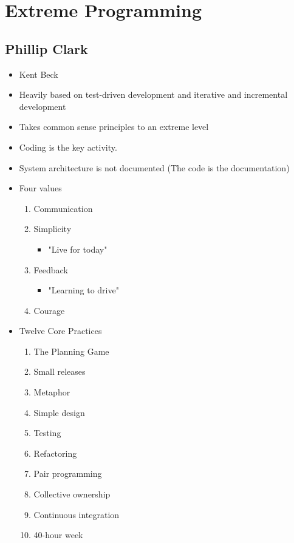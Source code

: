 \documentclass{report}
\begin{document}
		\section{Extreme Programming}
			\subsection{Phillip Clark}
				\begin{itemize}
					\item Kent Beck
					\item Heavily based on test-driven development and iterative and incremental development
					\item Takes common sense principles to an extreme level
					\item Coding is the key activity.
					\item System architecture is not documented (The code is the documentation)
					\item Four values
						\begin{enumerate}
							\item Communication
							\item Simplicity
								\begin{itemize}
									\item "Live for today"
								\end{itemize}
							\item Feedback
								\begin{itemize}
									\item "Learning to drive"
								\end{itemize}
							\item Courage
						\end{enumerate}
					\item Twelve Core Practices
						\begin{enumerate}
							\item The Planning Game
							\item Small releases
							\item Metaphor
							\item Simple design
							\item Testing
							\item Refactoring
							\item Pair programming
							\item Collective ownership
							\item Continuous integration
							\item 40-hour week
								\begin{itemize}

\end{itemize}
\end{enumerate}
\end{itemize}
\end{document}
